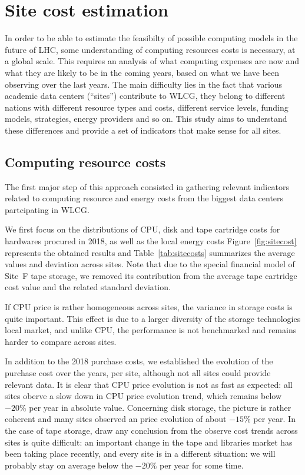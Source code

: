 \section{Site cost estimation}

In order to be able to estimate the feasibilty of possible computing models in the future of LHC, some understanding
of computing resources costs is necessary, at a global scale.
This requires an analysis of what computing expenses are now and what they are likely to be in the coming years, based on
what we have been observing over the last years.
The main difficulty lies in the fact that various academic data centers (``sites'') contribute to WLCG, they belong
to different nations with different resource types and costs, different service levels, funding models,
strategies, energy providers and so on. This study aims to understand these differences and provide a set of indicators
that make sense for all sites.


\subsection{\label{sec:sitecost:computing}Computing resource costs}

The first major step of this approach consisted in gathering relevant indicators related to computing resource and energy costs
from the biggest data centers partcipating in WLCG.

We first focus on the distributions of CPU, disk and tape cartridge costs for hardwares procured in 2018, as well as the
local energy costs
Figure~\ref{fig:sitecost} represents the obtained results and Table~\ref{tab:sitecosts} summarizes the average values
and deviation across sites. Note that due to the special financial model of Site~F tape storage, we removed its contribution
from the average tape cartridge cost value and the related standard deviation.

If CPU price is rather homogeneous across sites, the variance
in storage costs is quite important. This effect is due to a larger diversity of the storage technologies local market,
and unlike CPU, the performance is not benchmarked and remains harder to compare across sites.

In addition to the 2018 purchase costs, we established the evolution of the purchase cost over the years, per site,
although not all sites could provide relevant data. It is clear that CPU price evolution is not as fast as expected: all
sites oberve a slow down in CPU price evolution trend, which remains below $-20 \%$ per year in absolute value.
Concerning disk storage, the picture is rather coherent and many sites
observed an price evolution of about $-15 \%$ per year.
In the case of tape storage, draw any conclusion from the observe cost trends across sites is quite difficult:
an important change in the tape and libraries market has been taking place recently, and every site is in a different
situation: we will probably stay on average below the $-20 \%$ per year for some time.


